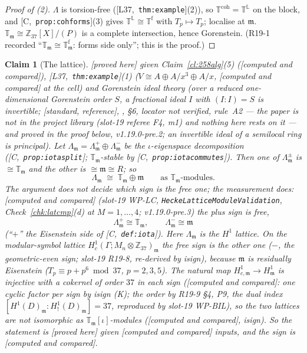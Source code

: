 \documentclass[11pt]{article}
\newtheorem{claim}[theorem]{Claim}
\theoremstyle{remark}
\newcommand{\Z}{\mathbb{Z}}
\newcommand{\Ga}{\Gamma}
\newcommand{\T}{\mathbb{T}}
\newcommand{\m}{\mathfrak{m}}
\newcommand{\Mn}{M_n}
\newcommand{\HA}[1]{[C,~\texttt{#1}]}      %
\newcommand{\PROVED}{\textsf{[proved here]}}
\newcommand{\STD}{\textsf{[standard, reference]}}
\newcommand{\CMPD}{\textsf{[computed and compared]}}   %
\newcommand{\Lcite}[1]{[L37,~\texttt{#1}]}             %
\begin{document}
\begin{proof}[Proof of (2)]
$\Lambda$ is torsion-free (\Lcite{thm:example}(2)), so $\T^{\mathrm{coh}}=\T^{\mathbb L}$ on the block, and \HA{prop:cohforms}(3) gives $\T^{\mathbb L}\cong\T^{\mathrm f}$ with
$T_p\mapsto T_p$; localise at $\m$. $\T_\m\cong\Z_{37}[X]/(P)$ is a complete intersection, hence Gorenstein. (R19-1 recorded ``$\T_\m\cong\T^{\mathrm f}_\m$: forms side only'';
this is the proof.)
\end{proof}

\begin{claim}[The lattice]\label{cl:258lattice}
\PROVED{} given Claim~\ref{cl:258alg}(5) (\CMPD), \Lcite{thm:example}(1) ($V\cong A\oplus A/x^{3}\oplus A/x$, \CMPD{} at the cell) and \emph{Gorenstein ideal
theory} (over a reduced one-dimensional Gorenstein order $S$, a fractional ideal $I$ with $(I:I)=S$ is invertible; \STD, \cite{bass_ubiquity}, \S6, locator not verified,
rule~A2 --- the paper is not in the project library (slot-19 referee F4, m1) and nothing here rests on it --- and proved in the proof below, v1.19.0-pre.2; an invertible ideal of a semilocal ring is principal). Let $\Lambda_\m=\Lambda_\m^{+}\oplus\Lambda_\m^{-}$ be the $\iota$-eigenspace decomposition
(\HA{prop:iotasplit}; $\T_\m$-stable by \HA{prop:iotacommutes}). Then one of $\Lambda_\m^{\pm}$ is $\cong\T_\m$ and the other is $\cong\m\cong R$; so
\[
  \Lambda_\m\;\cong\;\T_\m\oplus\m\qquad\text{as $\T_\m$-modules.}
\]
The argument does not decide which sign is the free one; the measurement does: \CMPD{} (slot-19 WP-LC, \texttt{HeckeLatticeModuleValidation},
Check~\ref{chk:latcmp}(d) at $M=1,\dots,4$; v1.19.0-pre.3) the \emph{plus} sign is free,
\[
  \Lambda_\m^{+}\cong\T_\m,\qquad\Lambda_\m^{-}\cong\m
\]
(``$+$'' the Eisenstein side of \HA{def:iota}). Here $\Lambda_\m$ is the $H^{1}$ lattice. On the modular-symbol lattice $H^{1}_c(\Ga;\Mn\otimes\Z_{37})_\m$ the free sign is the
other one ($-$, the geometric-even sign; slot-19 R19-8, re-derived by isign), because $\m$ is residually Eisenstein
($T_p\equiv p+p^{6}\bmod 37$, $p=2,3,5$). The natural map $H^{1}_{c,\m}\to H^{1}_\m$ is injective with a cokernel of
order $37$ in each sign (\CMPD: one cyclic factor per sign by isign (K); the order by R19-9 \S4, P9, the dual index $[H^{1}(D)_\m:H^{1}_{!}(D)_\m]=37$, reproduced by slot-19 WP-BIL), so the two lattices are not isomorphic as $\T_\m[\iota]$-modules (\CMPD, isign). So the statement is \PROVED{} given \CMPD{} inputs, and the sign is \CMPD.
\end{claim}
\end{document}
